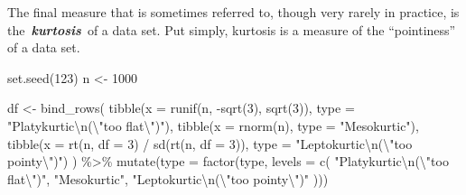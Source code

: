 \documentclass[
  letterpaper,
  DIV=11,
  numbers=noendperiod]{scrartcl}
\newenvironment{Shaded}{\begin{snugshade}}{\end{snugshade}}
\newcommand{\AttributeTok}[1]{\textcolor[rgb]{0.40,0.45,0.13}{#1}}
\newcommand{\DecValTok}[1]{\textcolor[rgb]{0.68,0.00,0.00}{#1}}
\newcommand{\FunctionTok}[1]{\textcolor[rgb]{0.28,0.35,0.67}{#1}}
\newcommand{\NormalTok}[1]{\textcolor[rgb]{0.00,0.23,0.31}{#1}}
\newcommand{\OtherTok}[1]{\textcolor[rgb]{0.00,0.23,0.31}{#1}}
\newcommand{\SpecialCharTok}[1]{\textcolor[rgb]{0.37,0.37,0.37}{#1}}
\newcommand{\StringTok}[1]{\textcolor[rgb]{0.13,0.47,0.30}{#1}}
\begin{document}
The final measure that is sometimes referred to, though very rarely in
practice, is the~\textbf{\emph{kurtosis}}~of a data set. Put simply,
kurtosis is a measure of the ``pointiness'' of a data set.

\begin{Shaded}
\begin{Highlighting}[]
\FunctionTok{set.seed}\NormalTok{(}\DecValTok{123}\NormalTok{)}
\NormalTok{n }\OtherTok{\textless{}{-}} \DecValTok{1000}

\NormalTok{df }\OtherTok{\textless{}{-}} \FunctionTok{bind\_rows}\NormalTok{(}
  \FunctionTok{tibble}\NormalTok{(}\AttributeTok{x =} \FunctionTok{runif}\NormalTok{(n, }\SpecialCharTok{{-}}\FunctionTok{sqrt}\NormalTok{(}\DecValTok{3}\NormalTok{),  }\FunctionTok{sqrt}\NormalTok{(}\DecValTok{3}\NormalTok{)), }\AttributeTok{type =} \StringTok{"Platykurtic}\SpecialCharTok{\textbackslash{}n}\StringTok{(}\SpecialCharTok{\textbackslash{}"}\StringTok{too flat}\SpecialCharTok{\textbackslash{}"}\StringTok{)"}\NormalTok{),}
  \FunctionTok{tibble}\NormalTok{(}\AttributeTok{x =} \FunctionTok{rnorm}\NormalTok{(n),                      }\AttributeTok{type =} \StringTok{"Mesokurtic"}\NormalTok{),}
  \FunctionTok{tibble}\NormalTok{(}\AttributeTok{x =} \FunctionTok{rt}\NormalTok{(n, }\AttributeTok{df =} \DecValTok{3}\NormalTok{) }\SpecialCharTok{/} \FunctionTok{sd}\NormalTok{(}\FunctionTok{rt}\NormalTok{(n, }\AttributeTok{df =} \DecValTok{3}\NormalTok{)), }\AttributeTok{type =} \StringTok{"Leptokurtic}\SpecialCharTok{\textbackslash{}n}\StringTok{(}\SpecialCharTok{\textbackslash{}"}\StringTok{too pointy}\SpecialCharTok{\textbackslash{}"}\StringTok{)"}\NormalTok{)}
\NormalTok{) }\SpecialCharTok{\%\textgreater{}\%}
  \FunctionTok{mutate}\NormalTok{(}\AttributeTok{type =} \FunctionTok{factor}\NormalTok{(type, }\AttributeTok{levels =} \FunctionTok{c}\NormalTok{(}
    \StringTok{"Platykurtic}\SpecialCharTok{\textbackslash{}n}\StringTok{(}\SpecialCharTok{\textbackslash{}"}\StringTok{too flat}\SpecialCharTok{\textbackslash{}"}\StringTok{)"}\NormalTok{,}
    \StringTok{"Mesokurtic"}\NormalTok{,}
    \StringTok{"Leptokurtic}\SpecialCharTok{\textbackslash{}n}\StringTok{(}\SpecialCharTok{\textbackslash{}"}\StringTok{too pointy}\SpecialCharTok{\textbackslash{}"}\StringTok{)"}
\NormalTok{  )))}


\end{Highlighting}
\end{Shaded}
\end{document}
